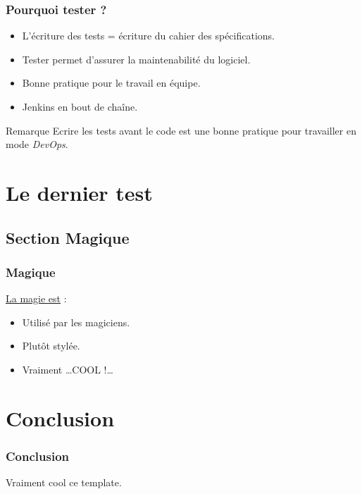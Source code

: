 \documentclass{beamer}
\begin{document}
\begin{frame}
\frametitle{Pourquoi tester ?}

\begin{itemize}
 \item L'écriture des tests = écriture du cahier des spécifications.\pause
 \item Tester permet d'assurer la maintenabilité du logiciel.\pause
 \item Bonne pratique pour le travail en équipe.\pause
 \item Jenkins en bout de chaîne.\pause
\end{itemize}

\begin{block}{Remarque}
Ecrire les tests avant le code est une bonne pratique pour travailler en mode \emph{DevOps}.
\end{block}

\end{frame}

\section{Le dernier test}

\subsection{Section Magique}
\begin{frame}
\frametitle{Magique}

\underline{La magie est} :
\begin{itemize}
 \item Utilisé par les magiciens. \pause
 \item Plutôt stylée. \pause
 \item \og Vraiment \ldots COOL !\ldots \fg{}
\end{itemize}

\end{frame}

\section{Conclusion}

\begin{frame}
\frametitle{Conclusion}

Vraiment cool ce template.


\end{frame}
\end{document}
